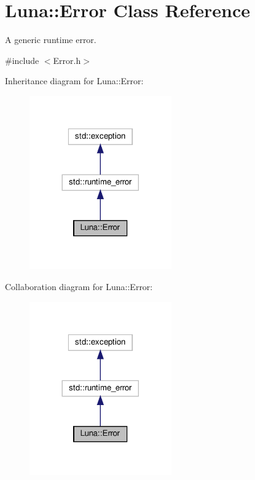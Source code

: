 \hypertarget{classLuna_1_1Error}{}\section{Luna\+:\+:Error Class Reference}
\label{classLuna_1_1Error}


A generic runtime error.  




{\ttfamily \#include $<$Error.\+h$>$}



Inheritance diagram for Luna\+:\+:Error\+:\nopagebreak
\begin{figure}[H]
\begin{center}
\leavevmode
\includegraphics[width=173pt]{classLuna_1_1Error__inherit__graph}
\end{center}
\end{figure}


Collaboration diagram for Luna\+:\+:Error\+:\nopagebreak
\begin{figure}[H]
\begin{center}
\leavevmode
\includegraphics[width=173pt]{classLuna_1_1Error__coll__graph}
\end{center}
\end{figure}
